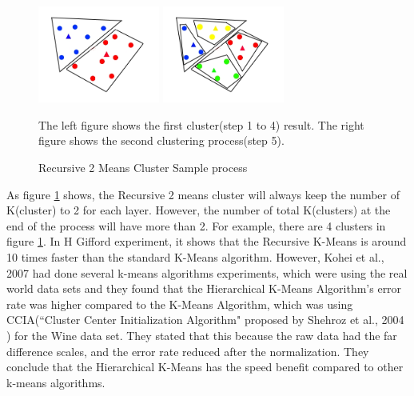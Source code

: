 \documentclass[runningheads,a4paper]{llncs}
\begin{document}

\begin{figure}[h]
	\centering
	\includegraphics[width=4cm,bb=0 0 377 300]{Sample2mean1.jpg}
	\includegraphics[width=4cm,bb=0 0 377 300]{Sample2mean2.jpg}	
	\caption{Recursive 2 Means Cluster Sample process}\label{fig:2MEANS}
	{\footnotesize The left figure shows the first cluster(step 1 to 4) result. The right figure shows the second clustering process(step 5). }
\end{figure}

As figure \ref{fig:2MEANS} shows, the Recursive 2 means cluster will always keep the number of K(cluster) to 2 for each layer. However, the number of total K(clusters) at the end of the process will have more than 2. For example, there are 4 clusters in figure \ref{fig:2MEANS}. 
In H Gifford \cite{giffordhierarchical} experiment, it shows that the Recursive K-Means is around 10 times faster than the standard K-Means algorithm. However, Kohei et al., 2007 \cite{arai2007hierarchical} had done several k-means algorithms experiments, which were using the real world data sets and they found that the Hierarchical K-Means Algorithm's error rate was higher compared to the K-Means Algorithm, which was using CCIA(``Cluster Center Initialization Algorithm" proposed by Shehroz et al., 2004 \cite{khan2004cluster} ) for the Wine data set. They stated that this because the raw data had the far difference scales, and the error rate reduced after the normalization. They conclude that the Hierarchical K-Means has the speed benefit compared to other k-means algorithms. 
\end{document}
